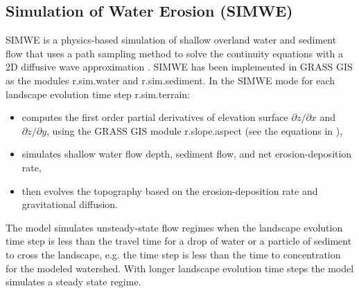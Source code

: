 \documentclass[gmd, manuscript]{copernicus}
\begin{document}
\subsection{Simulation of Water Erosion (SIMWE)} \label{simwe}


SIMWE is a physics-based simulation of shallow overland water and sediment flow
that uses a path sampling method to solve the continuity equations 
with a 2D diffusive wave approximation 
\citep{Mitas1998,Mitasova2004}.
SIMWE has been implemented in GRASS GIS as the modules 
r.sim.water
and r.sim.sediment. 
In the SIMWE mode for each landscape evolution time step
r.sim.terrain:
\begin{itemize}
  \item computes the first order partial derivatives of elevation surface
        $\partial z / \partial x$ and $\partial z / \partial y$, 
        using the GRASS GIS module r.slope.aspect (see the equations in \cite{hofierka2009}),
  \item simulates shallow water flow depth, sediment flow, and net erosion-deposition rate, 
  \item then evolves the topography based on the erosion-deposition rate
        and gravitational diffusion. 
\end{itemize}
%
The model simulates unsteady-state flow regimes
when the landscape evolution time step is less than the travel time 
for a drop of water or a particle of sediment to cross the landscape,
e.g. the time step is less than the time to concentration for the modeled watershed.
With longer landscape evolution time steps the model simulates a steady state regime. 

% 
\end{document}
